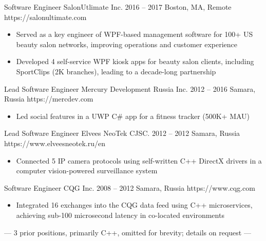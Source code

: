 \documentclass[9pt,a4paper]{juicv}
\begin{document}
\begin{paracol}{2}
    \cvLeftEvent
        {Software Engineer}
        {SalonUtlimate Inc.}
        {2016 -- 2017}
        {Boston, MA, Remote}
        {https://salonultimate.com}

        \begin{itemize}
            \item Served as a key engineer of WPF-based management software
                  for 100+ US beauty salon networks, improving operations and customer experience
            \item Developed 4 self-service WPF kiosk apps for beauty salon clients,
                  including SportClips (2K branches), leading to a decade-long partnership
        \end{itemize}

    \cvLeftEvent
        {Lead Software Engineer}
        {Mercury Development Russia Inc.}
        {2012 -- 2016}
        {Samara, Russia}
        {https://mercdev.com}

        \begin{itemize}
            \item Led social features in a UWP C\# app for a fitness tracker (500K+ MAU)
        \end{itemize}

    \cvLeftEvent
        {Lead Software Engineer}
        {Elvees NeoTek CJSC.}
        {2012 -- 2012}
        {Samara, Russia}
        {https://www.elveesneotek.ru/en}

        \begin{itemize}
            \item Connected 5 IP camera protocols using self-written C++ DirectX drivers
                  in a computer vision-powered surveillance system
        \end{itemize}

    \cvLeftEvent
        {Software Engineer}
        {CQG Inc.}
        {2008 -- 2012}
        {Samara, Russia}
        {https://www.cqg.com}

        \begin{itemize}
            \item Integrated 16 exchanges into the CQG data feed using C++ microservices,
                  achieving sub-100 microsecond latency in co-located environments
        \end{itemize}

    \vspace{2pt}
    \centerline{%
        \footnotesize
        \color{secondaryTextColor}
        --- 3 prior positions, primarily C++, omitted for brevity; details on request ---
    }%


\end{paracol}
\end{document}
